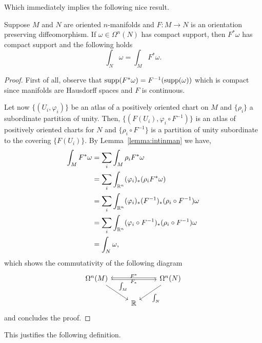 Which immediately implies the following nice result.
\begin{theorem}\label{thm:gcv}
	Suppose $M$ and $N$ are oriented $n$-manifolds and $F:M\to N$ is an orientation preserving diffeomorphism.
	If $\omega\in\Omega^n(N)$ has compact support, then $F^*\omega$ has compact support and the following holds
	\begin{equation}
		\int_N \omega = \int_M F^* \omega.
	\end{equation}
\end{theorem}
\begin{proof}
	First of all, observe that $\operatorname{supp}(F^*\omega) = F^{-1}(\operatorname{supp}(\omega))$ which is compact since manifolds are Hausdorff spaces and $F$ is continuous.

	Let now $\{(U_i,\varphi_i)\}$ be an atlas of a positively oriented chart on $M$ and $\{\rho_i\}$ a subordinate partition of unity.
	Then, $\{(F(U_i),\varphi_i\circ F^{-1})\}$ is an atlas of positively oriented charts for $N$ and $\{\rho_i \circ F^{-1}\}$ is a partition of unity subordinate to the covering $\{F(U_i)\}$.
	By Lemma~\ref{lemma:intinman} we have,
	\begin{align}
		\int_M F^*\omega & = \sum_i \int_M \rho_i F^*\omega                                           \\
		                 & = \sum_i \int_{\mathbb{R}^n}(\varphi_i)_*(\rho_i F^*\omega)                        \\
		                 & = \sum_i \int_{\mathbb{R}^n}(\varphi_i)_*(F^{-1})_*(\rho_i \circ F^{-1}) \omega    \\
		                 & = \sum_i \int_{\mathbb{R}^n}(\varphi_i \circ F^{-1})_*(\rho_i \circ F^{-1}) \omega \\
		                 & = \int_N\omega,
	\end{align}
	which shows the commutativity of the following diagram
	\begin{equation}
		\begin{tikzcd}
			\Omega^n(M)
			\arrow[rr, "F^*", above, shift right = 0.5]
			\arrow[dr, "\int_M", below left]
			& & \Omega^n(N)
			\arrow[ll, "F_*", below, shift right = 0.5]
			\arrow[dl, "\int_N"] \\
			& \R &
		\end{tikzcd}
	\end{equation}
	and concludes the proof.
\end{proof}

This justifies the following definition.

